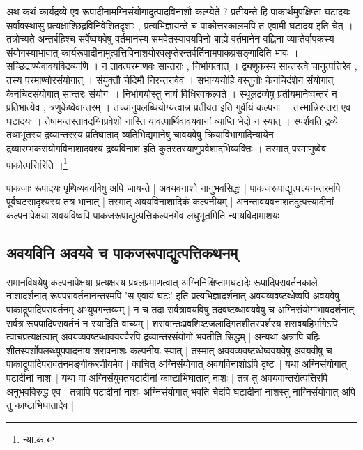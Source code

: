 {\fontsize{11.7}{0}\selectfont\s अथ कथं कार्यद्रव्ये एव रूपादीनामग्निसंयोगादुत्पादविनाशौ कल्प्येते ? प्रतीयन्ते हि पाकार्थमुपक्षिप्ता घटादयः सर्वावस्थासु प्रत्यक्षाश्छिद्रविनिवेशितदृशाः , प्रत्यभिज्ञायन्ते च पाकोत्तरकालमपि त एवामी घटादय इति चेत् । तत्रोच्यते अन्तर्बहिश्च सर्वेष्वयवेषु वर्तमानस्य समवेतस्यावयविनो बाह्ये वर्तमानेन  वह्निना व्याप्तेर्वापकस्य संयोगस्याभावात् कार्यरूपादीनामुत्पत्तिविनाशयोरक्लृप्तेरन्तर्वर्तिनामपाकप्रसङ्गादिति भावः । सच्छिद्राण्येवावयविद्रव्याणि । न तावत्परमाणवः सान्तराः , निर्भागत्वात् । द्व्यणुकस्य सान्तरत्वे चानुत्पत्तिरेव , तस्य परमाण्वोरसंयोगात् । संयुक्तौ चेदिमौ निरन्तरावेव । सभाग्ययोर्हि वस्तुनोः केनचिदंशेन संयोगात् केनचिदसंयोगात् सान्तरः संयोगः । निर्भागयोस्तु नायं विधिरवकल्पते । स्थूलद्रव्येषु प्रतीयमानेष्वन्तरं न प्रतिभात्येव , त्रणुकेष्वेवान्तरम् । तच्चानुपलब्धियोग्यत्वान्न प्रतीयत इति गुर्वीयं कल्पना । तस्मान्निरन्तरा एव घटादयः । तेषामन्तस्तावदग्निप्रवेशो नास्ति यावत्पार्थिवावयवानां व्याप्ति भेदो न स्यात् । स्पर्शवति द्रव्ये तथाभूतस्य द्रव्यान्तरस्य प्रतिघाताद् व्यतिभिद्यमानेषु चावयवेषु क्रियाविभागादिन्यायेन द्रव्यारम्भकसंयोगविनाशादवश्यं द्रव्यविनाश इति कुतस्तस्याणुप्रवेशादभिव्यक्तिः । तस्मात् परमाणुष्वेव पाकोत्पत्तिरिति ।\footnote{न्या.कं.}}


पाकजाः रूपादयः पृथिव्यवयविषु अपि जायन्ते | अवयवनाशो नानुभवसिद्धः | पाकजरूपाद्युत्पत्त्यनन्तरमपि पूर्वघटसादृश्यस्य तत्र भानात् | तस्मात् अवयविनाशादिकं कल्पनीयम् | अनन्तावयवनाशतदुत्पत्त्यादीनां कल्पनापेक्षया अवयविष्वपि पाकजरूपाद्युत्पत्तिकल्पनमेव लघुभूतमिति न्यायविदामाशयः |

\subsection{अवयविनि अवयवे च पाकजरूपाद्युत्पत्तिकथनम्}

समानविषयेषु कल्पनापेक्षया प्रत्यक्षस्य प्रबलप्रमाणत्वात् अग्निनिक्षिप्तामघटादेः रूपादिपरावर्तनकाले नाशादर्शनात् रूपपरावर्तनानन्तरमपि 'स एवायं घटः' इति प्रत्यभिज्ञादर्शनात् अवयव्यवष्टब्धेष्वपि अवयवेषु पाकाद्रूपादिपरावर्तनम् अभ्युपगन्तव्यम् | न च तदा सर्वत्रावयविषु तदवष्टब्धावयवेषु च अग्निसंयोगाभावदर्शनात् सर्वत्र रूपपादिपरावर्तनं न स्यादिति वाच्यम् | शरावान्तःप्रवशिष्टजलादिगतशीतस्पर्शस्य शरावबहिर्भागेऽपि त्वाचप्रत्यक्षत्वात् अवयव्यवष्टब्धावयववैरपि द्रव्यान्तरसंयोगो भवतीति सिद्धम् | अन्यथा अत्रापि बहिः शीतस्पर्शोपलब्ध्युपपादनाय शरावनाशः कल्पनीयः स्यात् | तस्मात् अवयव्यवष्टब्धेष्ववयवेषु अवयवीषु च पाकाद्रूपादिपरावर्तनमङ्गीकरणीयमेव | क्वचित् अग्निसंयोगात् अवयविनाशोऽपि दृष्टः | यथा अग्निसंयोगात् पटादीनां नाशः | यथा वा अग्निसंयुक्तघटादीनां काष्टाभिघातात् नाशः | तत्र तु अवयवान्तरोत्पत्तिरपि अनुभवविरुद्ध एव | तत्रापि पटादीनां नाशः‌ अग्निसंयोगात् भवति चेदपि घटादीनां नाशस्तु नाग्निसंयोगात् अपि तु काष्टाभिघातादेव |

